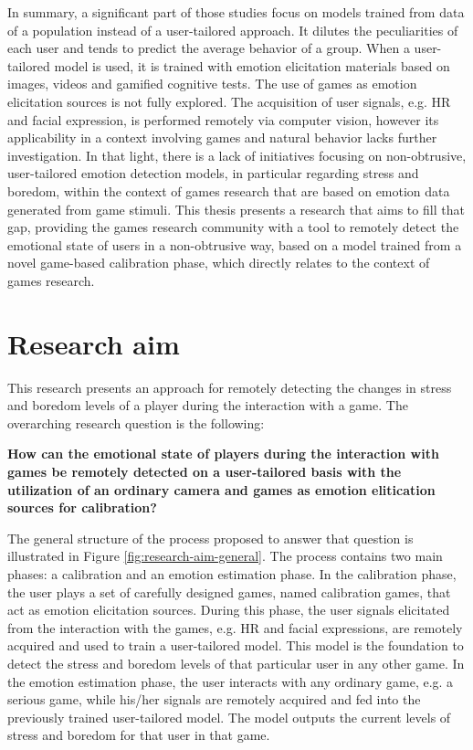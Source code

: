 In summary, a significant part of those studies focus on models trained from data of a population instead of a user-tailored approach. It dilutes the peculiarities of each user and tends to predict the average behavior of a group. When a user-tailored model is used, it is trained with emotion elicitation materials based on images, videos and gamified cognitive tests. The use of games as emotion elicitation sources is not fully explored. The acquisition of user signals, e.g. HR and facial expression, is performed remotely via computer vision, however its applicability in a context involving games and natural behavior lacks further investigation. In that light, there is a lack of initiatives focusing on non-obtrusive, user-tailored emotion detection models, in particular regarding stress and boredom, within the context of games research that are based on emotion data generated from game stimuli. This thesis presents a research that aims to fill that gap, providing the games research community with a tool to remotely detect the emotional state of users in a non-obtrusive way, based on a model trained from a novel game-based calibration phase, which directly relates to the context of games research.

\section{Research aim}
\label{sec:research-aim}

This research presents an approach for remotely detecting the changes in stress and boredom levels of a player during the interaction with a game. The overarching research question is the following:

\textbf{How can the emotional state of players during the interaction with games be remotely detected on a user-tailored basis with the utilization of an ordinary camera and games as emotion elitication sources for calibration?}

The general structure of the process proposed to answer that question is illustrated in Figure \ref{fig:research-aim-general}. The process contains two main phases: a calibration and an emotion estimation phase. In the calibration phase, the user plays a set of carefully designed games, named calibration games, that act as emotion elicitation sources. During this phase, the user signals elicitated from the interaction with the games, e.g. HR and facial expressions, are remotely acquired and used to train a user-tailored model. This model is the foundation to detect the stress and boredom levels of that particular user in any other game. In the emotion estimation phase, the user interacts with any ordinary game, e.g. a serious game, while his/her signals are remotely acquired and fed into the previously trained user-tailored model. The model outputs the current levels of stress and boredom for that user in that game.

